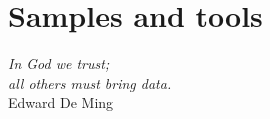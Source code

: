 \chapter{Samples and tools}
\label{chp:data}

\begin{flushright}
\begin{small}
\emph{In God we trust;\\all others must bring data.\\}
Edward De Ming
\end{small}
\end{flushright}

\minitoc





